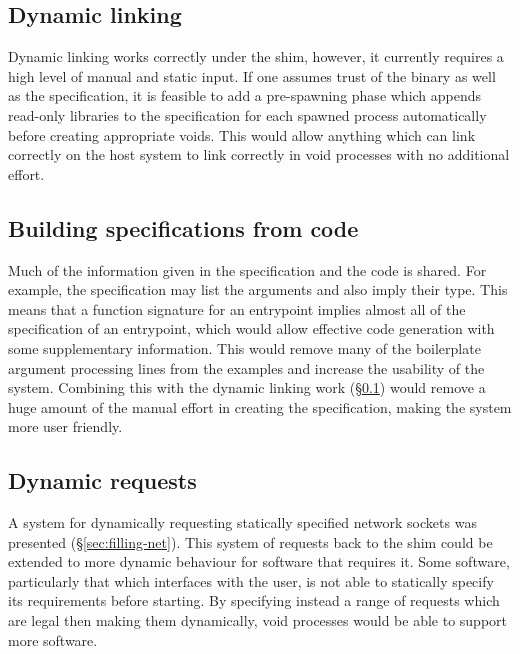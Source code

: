 \documentclass[12pt,a4paper,twoside]{report}
\begin{document}
\subsection{Dynamic linking}
\label{sec:future-work-dynamic-linking}

Dynamic linking works correctly under the shim, however, it currently requires a high level of manual and static input. If one assumes trust of the binary as well as the specification, it is feasible to add a pre-spawning phase which appends read-only libraries to the specification for each spawned process automatically before creating appropriate voids. This would allow anything which can link correctly on the host system to link correctly in void processes with no additional effort.

\subsection{Building specifications from code}
\label{sec:future-work-macros}

Much of the information given in the specification and the code is shared. For example, the specification may list the arguments and also imply their type. This means that a function signature for an entrypoint implies almost all of the specification of an entrypoint, which would allow effective code generation with some supplementary information. This would remove many of the boilerplate argument processing lines from the examples and increase the usability of the system. Combining this with the dynamic linking work (§\ref{sec:future-work-dynamic-linking}) would remove a huge amount of the manual effort in creating the specification, making the system more user friendly.

\subsection{Dynamic requests}

A system for dynamically requesting statically specified network sockets was presented (§\ref{sec:filling-net}). This system of requests back to the shim could be extended to more dynamic behaviour for software that requires it. Some software, particularly that which interfaces with the user, is not able to statically specify its requirements before starting. By specifying instead a range of requests which are legal then making them dynamically, void processes would be able to support more software.

\label{lastcontentpage} %

 


\appendix

\label{lastpage}
\end{document}
